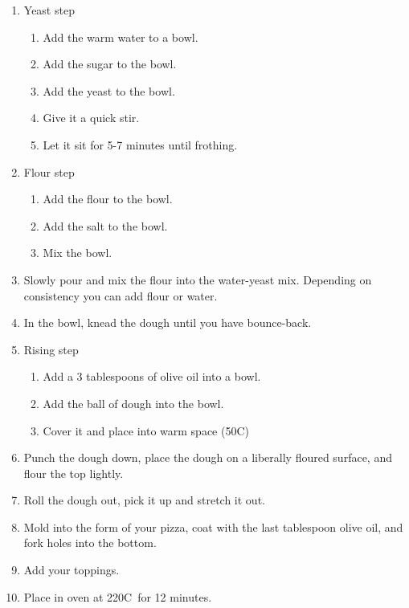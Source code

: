 \documentclass{article}
\begin{document}
\begin{enumerate}
    \item Yeast step
        \begin{enumerate}
            \item Add the warm water to a bowl.
            \item Add the sugar to the bowl.
            \item Add the yeast to the bowl.
            \item Give it a quick stir.
            \item Let it sit for 5-7 minutes until frothing.
        \end{enumerate}
    \item Flour step
        \begin{enumerate}
            \item Add the flour to the bowl.
            \item Add the salt to the bowl.
            \item Mix the bowl.
        \end{enumerate}
    \item Slowly pour and mix the flour into the water-yeast mix. Depending on consistency you can add flour or water.
    \item In the bowl, knead the dough until you have bounce-back.
    \item Rising step
        \begin{enumerate}
            \item Add a 3 tablespoons of olive oil into a bowl.
            \item Add the ball of dough into the bowl.
            \item Cover it and place into warm space (50C\textdegree)
        \end{enumerate}
    \item Punch the dough down, place the dough on a liberally floured surface, and flour the top lightly.
    \item Roll the dough out, pick it up and stretch it out.
    \item Mold into the form of your pizza, coat with the last tablespoon olive oil, and fork holes into the bottom.
    \item Add your toppings.
    \item Place in oven at 220C\textdegree\ for 12 minutes.
\end{enumerate}
\end{document}
